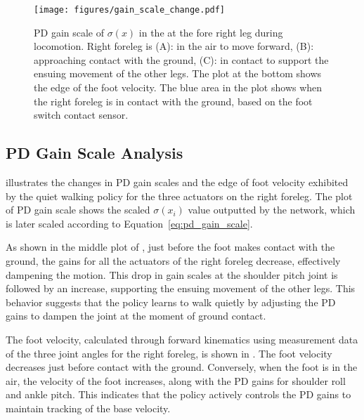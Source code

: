 \begin{figure}
    \centering
    \vspace{2pt}
    \texttt{[image: figures/gain\_scale\_change.pdf]}
    \caption{PD gain scale of $\sigma(x)$ in the  at the fore right leg during locomotion. Right foreleg is (A): in the air to move forward, (B): approaching contact with the ground, (C): in contact to support the ensuing movement of the other legs.  The plot at the bottom shows the edge of the foot velocity. The blue area in the plot shows when the right foreleg is in contact with the ground, based on the foot switch contact sensor.}
    \label{fig:gain_scale_change}
    \vspace{-2ex}
\end{figure}

\subsection{PD Gain Scale Analysis}
 illustrates the changes in PD gain scales and the edge of foot velocity exhibited by the quiet walking policy for the three actuators on the right foreleg. 
The plot of PD gain scale shows the scaled $\sigma(x_i)$ value outputted by the network, which is later scaled according to Equation~\ref{eq:pd_gain_scale}. 

As shown in the middle plot of , just before the foot makes contact with the ground, the gains for all the actuators of the right foreleg decrease, effectively dampening the motion. This drop in gain scales at the shoulder pitch joint is followed by an increase, supporting the ensuing movement of the other legs. This behavior suggests that the policy learns to walk quietly by adjusting the PD gains to dampen the joint at the moment of ground contact.

The foot velocity, calculated through forward kinematics using measurement data of the three joint angles for the right foreleg, is shown in . The foot velocity decreases just before contact with the ground. Conversely, when the foot is in the air, the velocity of the foot increases, along with the PD gains for shoulder roll and ankle pitch. This indicates that the policy actively controls the PD gains to maintain tracking of the base velocity.


